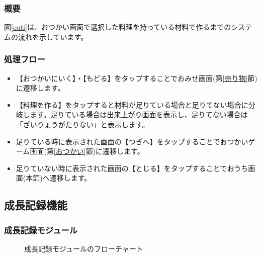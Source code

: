\documentclass[a4j]{jarticle}
\begin{document}
\subsubsection*{概要}
図\ref{outi}は、おつかい画面で選択した料理を持っている材料で作るまでのシステムの流れを示しています。

\subsubsection*{処理フロー}
\begin{itemize}
\item【おつかいにいく】・【もどる】をタップすることでおみせ画面(第\ref{売り物}節)に遷移します。
\item【料理を作る】をタップすると材料が足りている場合と足りてない場合に分岐します。足りている場合は出来上がり画面を表示し、足りてない場合は「ざいりょうがたりない」と表示します。
\item 足りている時に表示された画面の【つぎへ】をタップすることでおつかいゲーム画面(第\ref{おつかい}節)に遷移します。
\item 足りていない時に表示された画面の【とじる】をタップすることでおうち画面(本節)へ遷移します。
\end{itemize}


\subsection{成長記録機能}
\subsubsection{成長記録モジュール\label{grow}}
\begin{figure}[H]
    \begin{center}
    \caption {成長記録モジュールのフローチャート}
    \label{growall}
    \end{center}
\end{figure}
\end{document}
